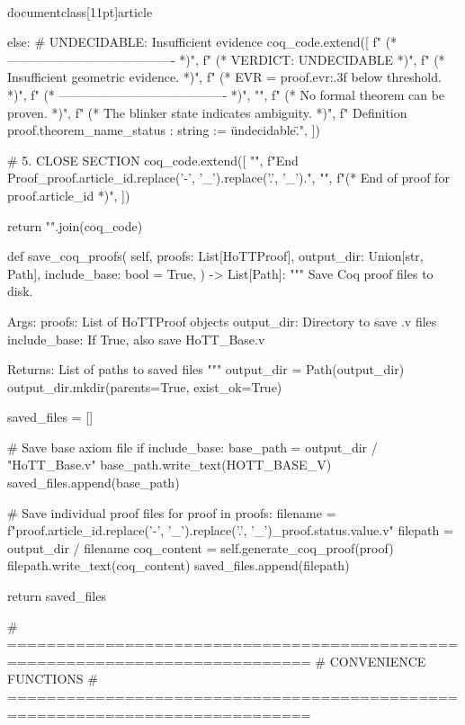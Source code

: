 \\documentclass[11pt]{article}
\begin{document}
\begin{CodeBlock}
        else:
            # UNDECIDABLE: Insufficient evidence
            coq_code.extend([
                f"  (* ---------------------------------------- *)",
                f"  (* VERDICT: UNDECIDABLE *)",
                f"  (* Insufficient geometric evidence. *)",
                f"  (* EVR = {proof.evr:.3f} below threshold. *)",
                f"  (* ---------------------------------------- *)",
                "",
                f"  (* No formal theorem can be proven. *)",
                f"  (* The blinker state indicates ambiguity. *)",
                f"  Definition {proof.theorem_name}_status : string := \"undecidable\".",
            ])

        # 5. CLOSE SECTION
        coq_code.extend([
            "",
            f"End Proof_{proof.article_id.replace('-', '_').replace('.', '_')}.",
            "",
            f"(* End of proof for {proof.article_id} *)",
        ])

        return "\n".join(coq_code)

    def save_coq_proofs(
        self,
        proofs: List[HoTTProof],
        output_dir: Union[str, Path],
        include_base: bool = True,
    ) -> List[Path]:
        """
        Save Coq proof files to disk.

        Args:
            proofs: List of HoTTProof objects
            output_dir: Directory to save .v files
            include_base: If True, also save HoTT_Base.v

        Returns:
            List of paths to saved files
        """
        output_dir = Path(output_dir)
        output_dir.mkdir(parents=True, exist_ok=True)

        saved_files = []

        # Save base axiom file
        if include_base:
            base_path = output_dir / "HoTT_Base.v"
            base_path.write_text(HOTT_BASE_V)
            saved_files.append(base_path)

        # Save individual proof files
        for proof in proofs:
            filename = f"{proof.article_id.replace('-', '_').replace('.', '_')}_{proof.status.value}.v"
            filepath = output_dir / filename
            coq_content = self.generate_coq_proof(proof)
            filepath.write_text(coq_content)
            saved_files.append(filepath)

        return saved_files


# =============================================================================
# CONVENIENCE FUNCTIONS
# =============================================================================


\end{CodeBlock}
\end{document}
